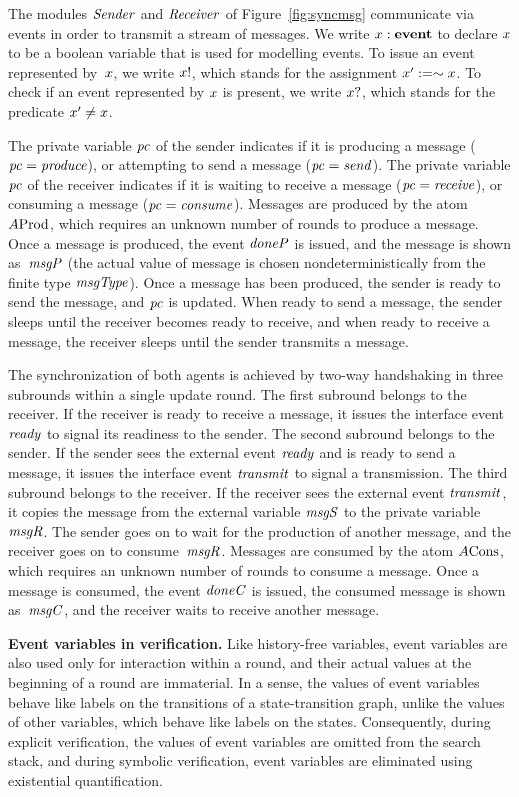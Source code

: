 The modules ${\it Sender\/}$ and ${\it Receiver\/}$ of
Figure~\ref{fig:syncmsg} communicate via events in order to
transmit a stream of messages. We write $x : {\hbox {\bf event\/}}$ to declare
$x$ to be a boolean variable that is used for modelling events.
To issue an event represented by~$x$, we write $x!$, which
stands for the assignment $x':=\sim x$. To check if an event
represented by $x$ is present, we write $x?$, which stands
for the predicate $x'\not=x$.

\mypar
The private variable ${\it pc\/}$ of the sender indicates if it is producing a
message (${\it pc\/}={\it produce\/}$), or attempting to send a message
(${\it pc\/}={\it send\/}$).
The private variable ${\it pc\/}$ of the receiver indicates if it is waiting to
receive a message (${\it pc\/}={\it receive\/}$), or consuming a message
(${\it pc\/}={\it consume\/}$).
Messages are produced by the atom $A{\rm Prod}$, which requires an unknown number
of rounds to produce a message.
Once a message is produced, the event ${\it doneP\/}$ is issued, and the message is
shown as~${\it msgP\/}$
(the actual value of message is chosen nondeterministically from the finite
type ${\it msgType\/}$).
Once a message has been produced, the sender is ready to send the message,
and ${\it pc\/}$ is updated.
When ready to send a message, the sender sleeps until the receiver becomes
ready to receive, and when ready to receive a message, the receiver sleeps
until the sender transmits a message.

\mypar
The synchronization of both agents is achieved by two-way handshaking in
three subrounds within a single update round.
The first subround belongs to the receiver.
If the receiver is ready to receive a message, it issues the interface event
${\it ready\/}$ to signal its readiness to the sender.
The second subround belongs to the sender.
If the sender sees the external event ${\it ready\/}$ and is ready to send a
message, it issues the interface event ${\it transmit\/}$ to signal a transmission.
The third subround belongs to the receiver.
If the receiver sees the external event ${\it transmit\/}$, it copies the message
from the external variable ${\it msgS\/}$ to the private variable~${\it msgR\/}$.
The sender goes on to wait for the production of another message, and the
receiver goes on to consume~${\it msgR\/}$.
Messages are consumed by the atom $A{\rm Cons}$, which requires an unknown number
of rounds to consume a message.
Once a message is consumed, the event ${\it doneC\/}$ is issued, the consumed
message is shown as~${\it msgC\/}$, and the receiver waits to receive another
message.

\mypar
{\bf Event variables in verification.}
Like history-free variables, event variables are also used only for
interaction within a round, and their actual values at the beginning of a
round are immaterial.
In a sense, the values of event variables behave like labels on the
transitions of a state-transition graph, unlike the values of other
variables, which behave like labels on the states.
Consequently, during explicit verification, the values of event variables are
omitted from the search stack, and during symbolic verification, event
variables are eliminated using existential quantification.

